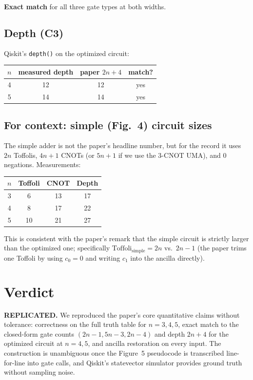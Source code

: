 \documentclass[11pt]{article}
\begin{document}
\textbf{Exact match} for all three gate types at both widths.

\subsection{Depth (C3)}
Qiskit's \texttt{depth()} on the optimized circuit:

\begin{center}
\begin{tabular}{cccc}
\toprule
$n$ & measured depth & paper $2n{+}4$ & match? \\ \midrule
4 & 12 & 12 & yes \\
5 & 14 & 14 & yes \\
\bottomrule
\end{tabular}
\end{center}

\subsection{For context: simple (Fig.~4) circuit sizes}
The simple adder is not the paper's headline number, but for the record it
uses $2n$ Toffolis, $4n{+}1$ CNOTs (or $5n{+}1$ if we use the 3-CNOT UMA),
and $0$ negations. Measurements:

\begin{center}
\begin{tabular}{cccc}
\toprule
$n$ & Toffoli & CNOT & Depth \\ \midrule
3 & 6 & 13 & 17 \\
4 & 8 & 17 & 22 \\
5 & 10 & 21 & 27 \\
\bottomrule
\end{tabular}
\end{center}

This is consistent with the paper's remark that the simple circuit is
strictly larger than the optimized one; specifically $\text{Toffoli}_{\text{simple}} = 2n$
vs.\ $2n{-}1$ (the paper trims one Toffoli by using $c_0{=}0$ and writing
$c_1$ into the ancilla directly).

\section{Verdict}

\textbf{REPLICATED.} We reproduced the paper's core quantitative claims
without tolerance: correctness on the full truth table for $n{=}3,4,5$, exact
match to the closed-form gate counts $(2n{-}1, 5n{-}3, 2n{-}4)$ and depth
$2n{+}4$ for the optimized circuit at $n{=}4,5$, and ancilla restoration on
every input. The construction is unambiguous once the Figure~5 pseudocode is
transcribed line-for-line into gate calls, and Qiskit's statevector
simulator provides ground truth without sampling noise.
\end{document}
